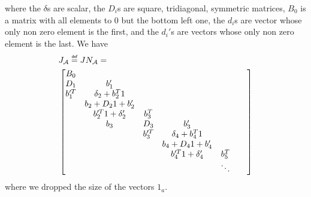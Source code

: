 \documentclass[]{article}
\newcommand{\BIN}{\begin{bmatrix}}
\newcommand{\BOUT}{\end{bmatrix}}
\newcommand\eqbydef{\mathrel{\overset{\makebox[0pt]{\mbox{\normalfont\tiny\sffamily def}}}{=}}}
\begin{document}
where the $\delta$s are scalar, the $D_i$s are square, tridiagonal, symmetric matrices, $B_0$ is a matrix with all elements to 0 but the bottom left one, the $d_i$s are vector whose only non zero element is the first, and the $d_i'$s are vectors whose only non zero element is the last.
We have
\begin{align*}
&J_\mathcal{A} \eqbydef JN_{\mathcal{A}} = \\
&\BIN
    B_0    &                      &        &                      &        &                                &            \\
    D_1    & b_1'                 &        &                      &        &                                &            \\
    b_1'^T & \delta_2 + b_2^T 1   &        &                      &        &                                &            \\
           & b_2 + D_2 1 + b_2'   &        &                      &        &                                &            \\
           & b_2'^T 1 + \delta_2' & b_3^T  &                      &        &                                &            \\
           & b_3                  & D_3    & b_3'                 &        &                                &            \\
           &                      & b_3'^T & \delta_4 + b_4^T 1   &        &                                &            \\
           &                      &        & b_4 + D_4 1 + b_4'   &        &                                &            \\
           &                      &        & b_4'^T 1 + \delta_4' & b_5^T  &                                &            \\
           &                      &        &                      & \ddots &                                &            \\
  \BOUT
\end{align*}
where we dropped the size of the vectors $1_a$.
\end{document}
